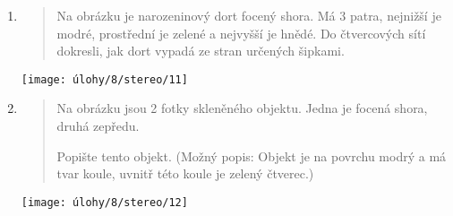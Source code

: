 \begin{enumerate}
    \item
    \begin{minipage}[t]{\linewidth}
        \begin{quote}
            Na obrázku je narozeninový dort focený shora. Má 3 patra, nejnižší je modré, prostřední je zelené a nejvyšší je hnědé. Do čtvercových sítí dokresli, jak dort vypadá ze stran určených šipkami.
        \end{quote}
        \centering
        \texttt{[image: úlohy/8/stereo/11]}
    \end{minipage}

    \item
    \begin{minipage}[t]{\linewidth}
        \begin{quote}
            Na obrázku jsou 2 fotky skleněného objektu. Jedna je focená shora, druhá zepředu.

            Popište tento objekt. (Možný popis: Objekt je na povrchu modrý a má tvar koule, uvnitř této koule je zelený čtverec.)
        \end{quote}
        \centering
        \texttt{[image: úlohy/8/stereo/12]}
    \end{minipage}

\end{enumerate}

\newpage

